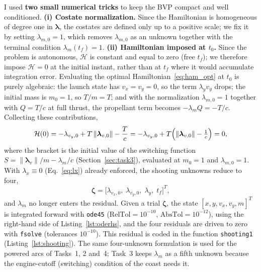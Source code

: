 \documentclass[../main.tex]{subfiles}
\begin{document}
I used \textbf{two small numerical tricks} to keep the BVP compact and well conditioned. \textbf{(i) Costate normalization.} Since the Hamiltonian is homogeneous of degree one in $\boldsymbol{\lambda}$, the costates are defined only up to a positive scale; we fix it by setting $\lambda_{m,0} = 1$, which removes $\lambda_{m,0}$ as an unknown together with the terminal condition $\lambda_m(t_f) = 1$. \textbf{(ii) Hamiltonian imposed at $t_0$.} Since the problem is autonomous, $\mathcal{H}$ is constant and equal to zero (free $t_f$); we therefore impose $\mathcal{H} = 0$ at the initial instant, rather than at $t_f$ where it would accumulate integration error. Evaluating the optimal Hamiltonian~\eqref{eq:ham_opt} at $t_0$ is purely algebraic: the launch state has $v_x = v_y = 0$, so the term $\lambda_y v_y$ drops; the initial mass is $m_0 = 1$, so $T/m = T$; and with the normalization $\lambda_{m,0} = 1$ together with $Q = T/c$ at full thrust, the propellant term becomes $-\lambda_m Q = -T/c$. Collecting these contributions,
\begin{equation}
    \mathcal{H}(0) = -\lambda_{v_y,0} + T\,\lVert\boldsymbol{\lambda}_{v,0}\rVert - \frac{T}{c}
    = -\lambda_{v_y,0} + T\Bigl(\lVert\boldsymbol{\lambda}_{v,0}\rVert - \tfrac{1}{c}\Bigr) = 0,
    \label{eq:H0}
\end{equation}
where the bracket is the initial value of the switching function $S = \|\boldsymbol{\lambda}_v\|/m - \lambda_m/c$ (Section~\ref{sec:task3}), evaluated at $m_0 = 1$ and $\lambda_{m,0} = 1$. With $\lambda_x \equiv 0$ (Eq.~\ref{eq:lx}) already enforced, the shooting unknowns reduce to four,
\begin{equation}
    \boldsymbol{\zeta} = \bigl[\lambda_{v_x,0},\;\lambda_{v_y,0},\;\lambda_y,\;t_f\bigr]^T,
    \label{eq:unknowns}
\end{equation}
and $\lambda_m$ no longer enters the residual. Given a trial $\boldsymbol{\zeta}$, the state $[x, y, v_x, v_y, m]^T$ is integrated forward with \texttt{ode45} ($\mathrm{RelTol} = 10^{-10}$, $\mathrm{AbsTol} = 10^{-12}$), using the right-hand side of Listing~\ref{lst:oderhs}, and the four residuals are driven to zero with \texttt{fsolve} (tolerances $10^{-10}$). This residual is coded in the function \texttt{shooting1} (Listing~\ref{lst:shooting}). The same four-unknown formulation is used for the powered arcs of Tasks~1, 2 and~4; Task~3 keeps $\lambda_m$ as a fifth unknown because the engine-cutoff (switching) condition of the coast needs it.
\end{document}
